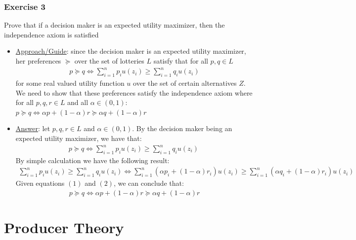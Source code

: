 \documentclass{article}
\begin{document}
\subsubsection{Exercise 3}
Prove that if a decision maker is an expected utility maximizer, then the independence axiom is satisfied \par \vspace{0.3em}
\begin{itemize}
  \item  \underline{Approach/Guide}: since the decision maker is an expected utility maximizer, her preferences $\succeq$ over the set of lotteries $L$ satisfy that for all $p,q \in L$
  \begin{gather*}
    p \succeq q \Leftrightarrow \sum_{i=1}^{n} p_{i}u(z_{i}) \geq \sum_{i=1}^{n} q_{i}u(z_{i})
  \end{gather*}
  for some real valued utility function $u$ over the set of certain alternatives $Z$. We need to show that these preferences satisfy the independence axiom where for all $p,q,r \in L$ and all $\alpha \in (0,1)$: $p \succeq q \Leftrightarrow \alpha p + (1-\alpha)r \succeq \alpha q + (1-\alpha)r$
  \item  \underline{Answer}: let $p,q,r \in L$ and $\alpha \in (0,1)$. By the decision maker being an expected utility maximizer, we have that:
  \begin{gather*}
    p \succeq q \Leftrightarrow \sum_{i=1}^{n} p_{i}u(z_{i}) \geq \sum_{i=1}^{n} q_{i}u(z_{i}) \ \tag{1}
  \end{gather*}
  By simple calculation we have the following result:
  \begin{gather*}
    \sum_{i=1}^{n} p_{i}u(z_{i}) \geq \sum_{i=1}^{n} q_{i}u(z_{i}) \Leftrightarrow \sum_{i=1}^{n} (\alpha p_{i} + (1- \alpha) r_{i})u(z_{i}) \geq \sum_{i=1}^{n} (\alpha q_{i} + (1- \alpha) r_{i})u(z_{i}) \ \tag{2}
  \end{gather*}
  Given equations $(1)$ and $(2)$, we can conclude that:
  \begin{gather*}
    p \succeq q \Leftrightarrow \alpha p + (1-\alpha)r \succeq \alpha q + (1-\alpha)r
  \end{gather*}
\end{itemize}



\newpage

\section{Producer Theory}
\end{document}
